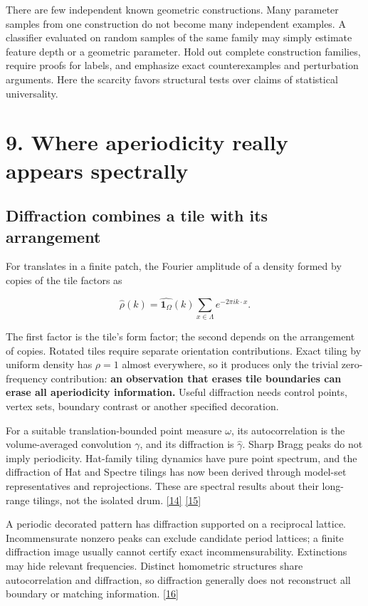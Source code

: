\documentclass[11pt]{article}
\begin{document}
There are few independent known geometric constructions. Many parameter samples from one construction do not become many independent examples. A classifier evaluated on random samples of the same family may simply estimate feature depth or a geometric parameter. Hold out complete construction families, require proofs for labels, and emphasize exact counterexamples and perturbation arguments. Here the scarcity favors structural tests over claims of statistical universality.




\section*{9. Where aperiodicity really appears spectrally}


\subsection*{Diffraction combines a tile with its arrangement}


For translates in a finite patch, the Fourier amplitude of a density formed by copies of the tile factors as


\[ \widehat\rho(k)=\widehat{\mathbf 1_\Omega}(k)\sum_{x\in\Lambda}e^{-2\pi i k\cdot x}. \]

The first factor is the tile's form factor; the second depends on the arrangement of copies. Rotated tiles require separate orientation contributions. Exact tiling by uniform density has \(\rho=1\) almost everywhere, so it produces only the trivial zero-frequency contribution: \textbf{an observation that erases tile boundaries can erase all aperiodicity information.} Useful diffraction needs control points, vertex sets, boundary contrast or another specified decoration.



For a suitable translation-bounded point measure \(\omega\), its autocorrelation is the volume-averaged convolution \(\gamma\), and its diffraction is \(\widehat\gamma\). Sharp Bragg peaks do not imply periodicity. Hat-family tiling dynamics have pure point spectrum, and the diffraction of Hat and Spectre tilings has now been derived through model-set representatives and reprojections. These are spectral results about their long-range tilings, not the isolated drum. \hyperlink{ref14}{[14]} \hyperlink{ref15}{[15]}



A periodic decorated pattern has diffraction supported on a reciprocal lattice. Incommensurate nonzero peaks can exclude candidate period lattices; a finite diffraction image usually cannot certify exact incommensurability. Extinctions may hide relevant frequencies. Distinct homometric structures share autocorrelation and diffraction, so diffraction generally does not reconstruct all boundary or matching information. \hyperlink{ref16}{[16]}
\end{document}

